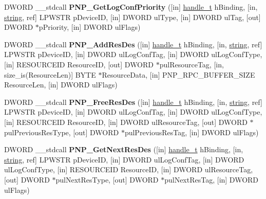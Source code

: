 \begin{DoxyCompactItemize}
\item 
\mbox{\label{interfacepnp_a9b5ada6a4cedd77e4b7bb58a258bac64}} 
D\+W\+O\+RD \+\_\+\+\_\+stdcall {\bfseries P\+N\+P\+\_\+\+Get\+Log\+Conf\+Priority} (\mbox{[}in\mbox{]} \hyperlink{interfacevoid}{handle\+\_\+t} h\+Binding, \mbox{[}in, \hyperlink{structstring}{string}, ref\mbox{]} L\+P\+W\+S\+TR p\+Device\+ID, \mbox{[}in\mbox{]} D\+W\+O\+RD ul\+Type, \mbox{[}in\mbox{]} D\+W\+O\+RD ul\+Tag, \mbox{[}out\mbox{]} D\+W\+O\+RD $\ast$p\+Priority, \mbox{[}in\mbox{]} D\+W\+O\+RD ul\+Flags)
\item 
\mbox{\label{interfacepnp_a666e4ed5cd1c176745cca48607995146}} 
D\+W\+O\+RD \+\_\+\+\_\+stdcall {\bfseries P\+N\+P\+\_\+\+Add\+Res\+Des} (\mbox{[}in\mbox{]} \hyperlink{interfacevoid}{handle\+\_\+t} h\+Binding, \mbox{[}in, \hyperlink{structstring}{string}, ref\mbox{]} L\+P\+W\+S\+TR p\+Device\+ID, \mbox{[}in\mbox{]} D\+W\+O\+RD ul\+Log\+Conf\+Tag, \mbox{[}in\mbox{]} D\+W\+O\+RD ul\+Log\+Conf\+Type, \mbox{[}in\mbox{]} R\+E\+S\+O\+U\+R\+C\+E\+ID Resource\+ID, \mbox{[}out\mbox{]} D\+W\+O\+RD $\ast$pul\+Resource\+Tag, \mbox{[}in, size\+\_\+is(Resource\+Len)\mbox{]} B\+Y\+TE $\ast$Resource\+Data, \mbox{[}in\mbox{]} P\+N\+P\+\_\+\+R\+P\+C\+\_\+\+B\+U\+F\+F\+E\+R\+\_\+\+S\+I\+ZE Resource\+Len, \mbox{[}in\mbox{]} D\+W\+O\+RD ul\+Flags)
\item 
\mbox{\label{interfacepnp_ad4b76741b7853f95396a593aebe3c4b7}} 
D\+W\+O\+RD \+\_\+\+\_\+stdcall {\bfseries P\+N\+P\+\_\+\+Free\+Res\+Des} (\mbox{[}in\mbox{]} \hyperlink{interfacevoid}{handle\+\_\+t} h\+Binding, \mbox{[}in, \hyperlink{structstring}{string}, ref\mbox{]} L\+P\+W\+S\+TR p\+Device\+ID, \mbox{[}in\mbox{]} D\+W\+O\+RD ul\+Log\+Conf\+Tag, \mbox{[}in\mbox{]} D\+W\+O\+RD ul\+Log\+Conf\+Type, \mbox{[}in\mbox{]} R\+E\+S\+O\+U\+R\+C\+E\+ID Resource\+ID, \mbox{[}in\mbox{]} D\+W\+O\+RD ul\+Resource\+Tag, \mbox{[}out\mbox{]} D\+W\+O\+RD $\ast$pul\+Previous\+Res\+Type, \mbox{[}out\mbox{]} D\+W\+O\+RD $\ast$pul\+Previous\+Res\+Tag, \mbox{[}in\mbox{]} D\+W\+O\+RD ul\+Flags)
\item 
\mbox{\label{interfacepnp_a3ffd53989b3bb6d66afd6cdd26ac9bc3}} 
D\+W\+O\+RD \+\_\+\+\_\+stdcall {\bfseries P\+N\+P\+\_\+\+Get\+Next\+Res\+Des} (\mbox{[}in\mbox{]} \hyperlink{interfacevoid}{handle\+\_\+t} h\+Binding, \mbox{[}in, \hyperlink{structstring}{string}, ref\mbox{]} L\+P\+W\+S\+TR p\+Device\+ID, \mbox{[}in\mbox{]} D\+W\+O\+RD ul\+Log\+Conf\+Tag, \mbox{[}in\mbox{]} D\+W\+O\+RD ul\+Log\+Conf\+Type, \mbox{[}in\mbox{]} R\+E\+S\+O\+U\+R\+C\+E\+ID Resource\+ID, \mbox{[}in\mbox{]} D\+W\+O\+RD ul\+Resource\+Tag, \mbox{[}out\mbox{]} D\+W\+O\+RD $\ast$pul\+Next\+Res\+Type, \mbox{[}out\mbox{]} D\+W\+O\+RD $\ast$pul\+Next\+Res\+Tag, \mbox{[}in\mbox{]} D\+W\+O\+RD ul\+Flags)

\end{DoxyCompactItemize}
